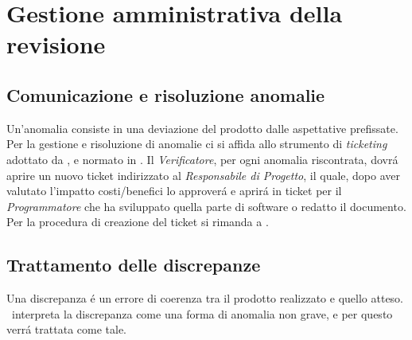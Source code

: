\section{Gestione amministrativa della revisione}
\subsection{Comunicazione e risoluzione anomalie}
Un'anomalia consiste in una deviazione del prodotto dalle aspettative prefissate. Per la gestione e risoluzione di anomalie ci si affida allo strumento di
\textit{ticketing} adottato da \gruppo, e normato in \infoNDP. 
Il \textit{Verificatore}, per ogni anomalia riscontrata, dovr\'a aprire un nuovo ticket indirizzato al \textit{Responsabile di Progetto}, il quale, dopo aver valutato l'impatto costi/benefici lo approver\'a e aprir\'a in ticket per il \textit{Programmatore} che ha sviluppato quella parte di software o redatto il documento.
Per la procedura di creazione del ticket si rimanda a \infoNDP.
\subsection{Trattamento delle discrepanze}
Una discrepanza \'e un errore di coerenza tra il prodotto realizzato e quello atteso. \gruppo ~interpreta la discrepanza come una forma di anomalia non grave, e per questo verr\'a trattata come tale.
